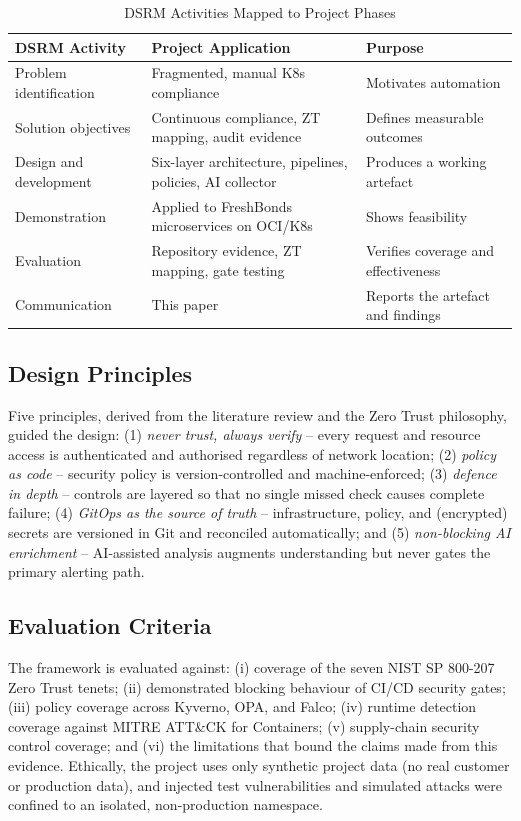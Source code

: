 \documentclass[conference]{IEEEtran}
\begin{document}
\begin{table}[!t]
\caption{DSRM Activities Mapped to Project Phases}
\label{tab:dsrm}
\centering
\footnotesize
\begin{tabular}{@{}p{2.3cm}p{2.9cm}p{2.4cm}@{}}
\toprule
\textbf{DSRM Activity} & \textbf{Project Application} & \textbf{Purpose} \\
\midrule
Problem identification & Fragmented, manual K8s compliance & Motivates automation \\
Solution objectives & Continuous compliance, ZT mapping, audit evidence & Defines measurable outcomes \\
Design and development & Six-layer architecture, pipelines, policies, AI collector & Produces a working artefact \\
Demonstration & Applied to FreshBonds microservices on OCI/K8s & Shows feasibility \\
Evaluation & Repository evidence, ZT mapping, gate testing & Verifies coverage and effectiveness \\
Communication & This paper & Reports the artefact and findings \\
\bottomrule
\end{tabular}
\end{table}

\subsection{Design Principles}
Five principles, derived from the literature review and the Zero Trust philosophy, guided the design: (1) \emph{never trust, always verify} -- every request and resource access is authenticated and authorised regardless of network location; (2) \emph{policy as code} -- security policy is version-controlled and machine-enforced; (3) \emph{defence in depth} -- controls are layered so that no single missed check causes complete failure; (4) \emph{GitOps as the source of truth} -- infrastructure, policy, and (encrypted) secrets are versioned in Git and reconciled automatically; and (5) \emph{non-blocking AI enrichment} -- AI-assisted analysis augments understanding but never gates the primary alerting path.

\subsection{Evaluation Criteria}
The framework is evaluated against: (i) coverage of the seven NIST SP 800-207 Zero Trust tenets; (ii) demonstrated blocking behaviour of CI/CD security gates; (iii) policy coverage across Kyverno, OPA, and Falco; (iv) runtime detection coverage against MITRE ATT\&CK for Containers; (v) supply-chain security control coverage; and (vi) the limitations that bound the claims made from this evidence. Ethically, the project uses only synthetic project data (no real customer or production data), and injected test vulnerabilities and simulated attacks were confined to an isolated, non-production namespace.
\end{document}
